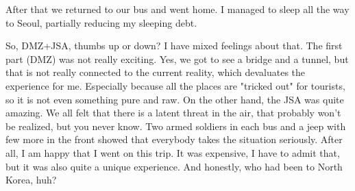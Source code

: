 \begin{post}
\begin{content}

After that we returned to our bus and went home. I managed to sleep all the way to Seoul, partially reducing my sleeping debt.

\begin{figure}
\vspace{-12pt}
\centering{}
\vspace{-24pt}
\end{figure}So, DMZ+JSA, thumbs up or down? I have mixed feelings about that. The first part (DMZ) was not really exciting. Yes, we got to see a bridge and a tunnel, but that is not really connected to the current reality, which devaluates the experience for me. Especially because all the places are "tricked out" for tourists, so it is not even something pure and raw. On the other hand, the JSA was quite amazing. We all felt that there is a latent threat in the air, that probably won't be realized, but you never know. Two armed soldiers in each bus and a jeep with few more in the front showed that everybody takes the situation seriously. After all, I am happy that I went on this trip. It was expensive, I have to admit that, but it was also quite a unique experience. And honestly, who had been to North Korea, huh?
	\end{content}
\end{post}
